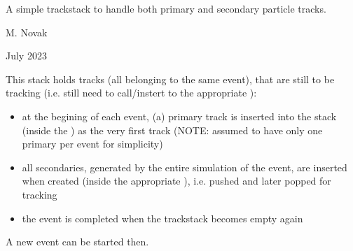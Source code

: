 \documentclass[letterpaper,10pt,english]{sphinxmanual}
\begin{document}
\begin{fulllineitems}
\label{\detokenize{Simulation/SimulationCodeDoc:_CPPv410TrackStack}}
\pysigstartsignatures
\pysigstartmultiline
{}
\pysigstopmultiline
\pysigstopsignatures
\sphinxAtStartPar
A simple track\sphinxhyphen{}stack to handle both primary and secondary particle tracks. 

\sphinxAtStartPar
\begin{description}
\sphinxAtStartPar
M. Novak 

\sphinxAtStartPar
July 2023

\end{description}


\sphinxAtStartPar
This stack holds tracks (all belonging to the same event), that are still to be tracking (i.e. still need to call/instert to the appropriate ):\begin{itemize}
\item {} 
\sphinxAtStartPar
at the begining of each event, (a) primary track is inserted into the stack (inside the ) as the very first track (NOTE: assumed to have only one primary per event for simplicity)

\item {} 
\sphinxAtStartPar
all secondaries, generated by the entire simulation of the event, are inserted when created (inside the appropriate ), i.e. pushed and later popped for tracking

\item {} 
\sphinxAtStartPar
the event is completed when the track\sphinxhyphen{}stack becomes empty again

\end{itemize}


\sphinxAtStartPar
A new event can be started then. 


\end{fulllineitems}
\end{document}

